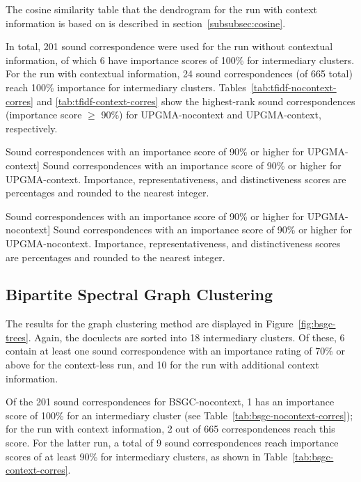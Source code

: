 \documentclass[a4paper]{article}
\begin{document}
The cosine similarity table that the dendrogram
for the run with context information is based on
is described in section~\ref{subsubsec:cosine}.

In total, 201 sound correspondence were used for the run without contextual information,
of which 6 have importance scores of 100\% for intermediary clusters.
For the run with contextual information,
24 sound correspondences (of 665 total) reach 100\% importance for intermediary clusters.
Tables~\ref{tab:tfidf-nocontext-corres} and \ref{tab:tfidf-context-corres}
show the highest-rank sound correspondences (importance score $\geq$ 90\%)
for UPGMA-nocontext and UPGMA-context, respectively.

\begin{table}[h]
\centering

\caption
[Sound correspondences with an importance score of 90\% or higher for UPGMA-context]
{Sound correspondences with an importance score of 90\% or higher for UPGMA-context.
Importance, representativeness, and distinctiveness scores are percentages
and rounded to the nearest integer.
}
\label{tab:tfidf-context-corres}
\end{table}

\begin{table}[h]
\centering

\caption
[Sound correspondences with an importance score of 90\% or higher for UPGMA-nocontext]
{Sound correspondences with an importance score of 90\% or higher for UPGMA-nocontext.
Importance, representativeness, and distinctiveness scores are percentages
and rounded to the nearest integer.
}
\label{tab:tfidf-nocontext-corres}
\end{table}
\FloatBarrier

\subsection{Bipartite Spectral Graph Clustering}

The results for the graph clustering method are
displayed in Figure~\ref{fig:bsgc-trees}.
Again, the doculects are sorted into 18 intermediary clusters.
Of these, 6 contain at least one sound correspondence
with an importance rating of 70\% or above for the context-less run,
and 10 for the run with additional context information.

Of the 201 sound correspondences for BSGC-nocontext,
1 has an importance score of 100\% for an intermediary cluster
(see Table~\ref{tab:bsgc-nocontext-corres});
for the run with context information, 2 out of 665 correspondences reach this score.
For the latter run, a total of 9 sound correspondences
reach importance scores of at least 90\%
for intermediary clusters, as shown in Table~\ref{tab:bsgc-context-corres}.
\end{document}
